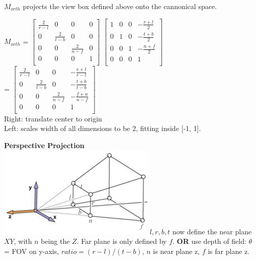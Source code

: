 \documentclass[letterpaper, 8pt]{extarticle}
\begin{document}
\begin{multicols*}{4}
$M_{orth}$ projects the view box defined above onto the cannonical space. 


$M_{orth}$ = \(
\begin{bmatrix}
    \frac{2}{r-l} & 0 & 0 & 0 \\
    0 & \frac{2}{t-b} & 0 & 0 \\
    0 & 0 & \frac{2}{n-f} & 0 \\
    0 & 0 & 0 & 1 \\
\end{bmatrix}
\)
\(
\begin{bmatrix}
    1 & 0 & 0 & -\frac{r+l}{2} \\
    0 & 1 & 0 & -\frac{t+b}{2} \\
    0 & 0 & 1 & -\frac{n+f}{2} \\
    0 & 0 & 0 & 1 \\
\end{bmatrix}
\)\\
=
\(
\begin{bmatrix}
    \frac{2}{r-l} & 0 & 0 & -\frac{r+l}{r-l} \\
    0 & \frac{2}{t-b} & 0 & -\frac{t+b}{t-b} \\
    0 & 0 & \frac{2}{n-f} & -\frac{f+n}{n-f} \\
    0 & 0 & 0 & 1 \\
\end{bmatrix}
\)\\
Right: translate center to origin\\
Left: scales width of all dimensions to be 2, fitting inside [-1, 1].

\textbf{Perspective Projection}\\
\includegraphics[width=\linewidth]{cam-persp.png} 
$l,r,b,t$ now define the near plane $XY$, with $n$ being the $Z$. Far plane is only defined by $f$. 
\textbf{OR} use depth of field: 
$\theta$ = FOV on y-axis, $ratio = (r-l)/(t-b)$, $n$ is near plane z, $f$ is far plane z.


\end{multicols*}
\end{document}
